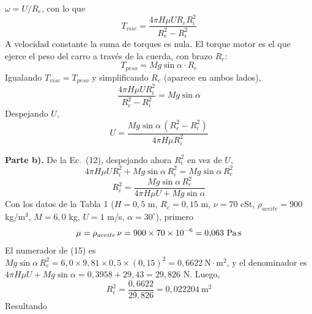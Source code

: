 \documentclass[11pt]{article}
\begin{document}
$\omega=U/R_e$, con lo que
\begin{equation}
T_{visc}=\frac{4\pi H\mu U R_eR_i^2}{R_e^2-R_i^2}
\end{equation}
A velocidad constante la suma de torques es nula. El torque motor es el que ejerce el
peso del carro a trav\'es de la cuerda, con brazo $R_e$:
\begin{equation}
T_{peso}=Mg\sin\alpha\cdot R_e
\end{equation}
Igualando $T_{visc}=T_{peso}$ y simplificando $R_e$ (aparece en ambos lados),
\begin{equation}
\frac{4\pi H\mu U R_i^2}{R_e^2-R_i^2}=Mg\sin\alpha
\end{equation}
Despejando $U$,
\begin{equation}
\boxed{U=\frac{Mg\sin\alpha\,(R_e^2-R_i^2)}{4\pi H\mu R_i^2}}
\end{equation}

\textbf{Parte b).} De la Ec.~(12), despejando ahora $R_i^2$ en vez de $U$,
\begin{equation}
4\pi H\mu U R_i^2+Mg\sin\alpha\,R_i^2=Mg\sin\alpha\,R_e^2
\end{equation}
\begin{equation}
\boxed{R_i^2=\frac{Mg\sin\alpha\,R_e^2}{4\pi H\mu U+Mg\sin\alpha}}
\end{equation}
Con los datos de la Tabla 1 ($H=0{,}5$ m, $R_e=0{,}15$ m, $\nu=70$ cSt,
$\rho_{aceite}=900$ kg/m$^3$, $M=6{,}0$ kg, $U=1$ m/s, $\alpha=30^\circ$), primero
\begin{equation}
\mu=\rho_{aceite}\,\nu=900\times70\times10^{-6}=0{,}063\ \text{Pa\,s}
\end{equation}
El numerador de (15) es $Mg\sin\alpha\,R_e^2=6{,}0\times9{,}81\times0{,}5\times(0{,}15)^2
=0{,}6622\ \text{N}\cdot\text{m}^2$, y el denominador es
$4\pi H\mu U+Mg\sin\alpha=0{,}3958+29{,}43=29{,}826$ N. Luego,
\begin{equation}
R_i^2=\frac{0{,}6622}{29{,}826}=0{,}022204\ \text{m}^2
\end{equation}
Resultando
\begin{center}
\end{center}

\newpage
{}
\end{document}
